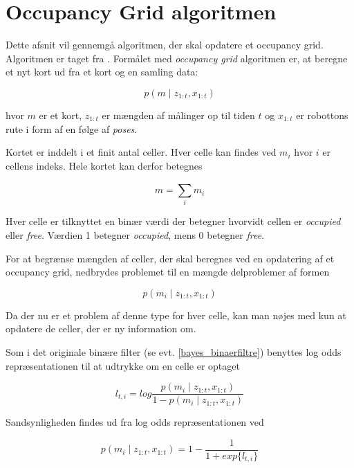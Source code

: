 \section{Occupancy Grid algoritmen}
Dette afsnit vil gennemgå algoritmen, der skal opdatere et occupancy grid.
Algoritmen er taget fra \cite[p. 286]{probabilisticRobotics}.
Formålet med \textit{occupancy grid} algoritmen er, at beregne	et nyt kort ud fra et kort og en samling data:

\begin{equation}
p(m \mid z_{1:t}, x_{1:t})
\end{equation}

hvor $m$ er et kort, $ z_{1:t} $ er mængden af målinger op til tiden $t$ og $ x_{1:t} $ er robottons rute i form af en følge af \textit{poses}.

Kortet er inddelt i et finit antal celler.
Hver celle kan findes ved $ m_i $ hvor $i$ er cellens indeks. 
Hele kortet kan derfor betegnes

\begin{equation}
m = \sum_{i}^{} m_i 
\end{equation}

Hver celle er tilknyttet en binær værdi der betegner hvorvidt cellen er \textit{occupied} eller \textit{free}.
Værdien 1 betegner \textit{occupied}, mens 0 betegner \textit{free}.

For at begrænse mængden af celler, der skal beregnes ved en opdatering af et occupancy grid, nedbrydes problemet til en mængde delproblemer af formen

\begin{equation}
p(m_i \mid z_{1:t}, x_{1:t})
\end{equation} 

Da der nu er et problem af denne type for hver celle, kan man nøjes med kun at opdatere de celler, der er ny information om.

Som i det originale binære filter (se evt. \cref{bayes_binaerfiltre}) benyttes log odds repræsentationen til at udtrykke om en celle er optaget

\begin{equation}
l_{t,i} = log{ \frac{p(m_i \mid z_{1:t}, x_{1:t})}{1 - p(m_i \mid z_{1:t}, x_{1:t})}} 
\end{equation} 

Sandsynligheden findes ud fra log odds repræsentationen ved

\begin{equation}
p(m_i \mid z_{1:t}, x_{1:t}) = 1 - \frac{1}{1 + exp \{ l_{t,i} \} }
\end{equation} 

